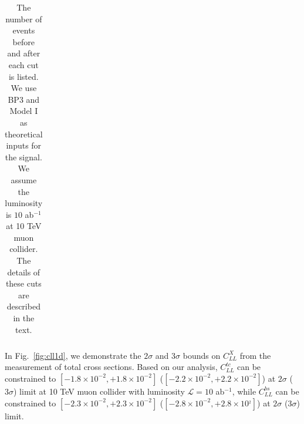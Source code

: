 \documentclass[a4paper,11pt]{article}
\begin{document}
\begin{center}
\begin{table}
\begin{center}
\begin{tabular}{|c|c|c|c|c|c|c|}
  \hline
  \end{tabular}
  \end{center}
  \caption{The number of events before and after each cut is listed. We use BP3 and Model I as theoretical inputs for the signal. We assume the luminosity is $10$ ab$^{-1}$ at 10 TeV muon collider. The details of these cuts are described in the text.\label{table:bs:cut}}
\end{table}
\end{center}

In Fig.~\ref{fig:cll1d}, we demonstrate the $2\sigma$ and $3\sigma$ bounds on $C^{X}_{LL}$ from the measurement of total cross sections. Based on our analysis, $C^{tc}_{LL}$ can be constrained to $[-1.8\times 10^{-2}, +1.8\times 10^{-2}]$ ($[-2.2\times 10^{-2}, +2.2\times10^{-2}]$) at $2\sigma$ ($3\sigma$) limit at 10 TeV muon collider with luminosity $\mathcal{L}=10$ ab$^{-1}$, while 
$C^{bs}_{LL}$ can be constrained to $[-2.3\times 10^{-2}, +2.3 \times 10^{-2}]$ ($[-2.8\times 10^{-2}, +2.8\times 10^{_2}]$) at $2\sigma$ ($3\sigma$) limit. 
\end{document}
